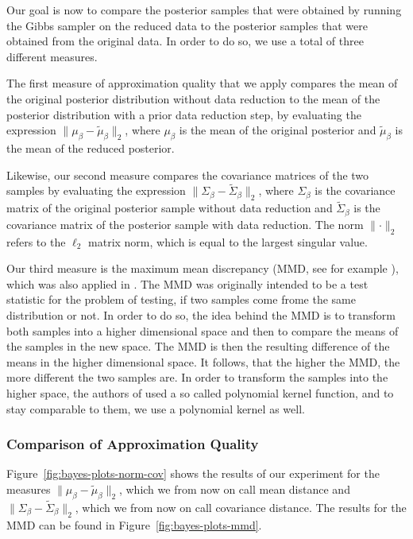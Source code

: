Our goal is now to compare the posterior samples that were
obtained by running the Gibbs sampler on the reduced data
to the posterior samples that were obtained from the
original data.
In order to do so, we use a total of three different measures.

The first measure of approximation quality that we
apply compares the mean
of the original posterior distribution without data reduction to
the mean of the posterior distribution with a prior data reduction step,
by evaluating the expression
$\lVert \mu_\beta - \widetilde{\mu}_\beta \rVert_2$,
where $\mu_\beta$ is the mean of the original posterior and
$\widetilde{\mu}_\beta$ is the mean of the reduced posterior.

Likewise, our second measure compares the covariance matrices of
the two samples by evaluating the expression
$\lVert \Sigma_\beta - \widetilde{\Sigma}_\beta \rVert_2$,
where $\Sigma_\beta$ is the covariance matrix of the original
posterior sample without data reduction and
$\widetilde{\Sigma}_\beta$ is the covariance matrix of the
posterior sample with data reduction. The norm $\lVert \cdot \rVert_2$
refers to the $\ell_2$ matrix norm, which is equal to the
largest singular value.

Our third measure is the maximum mean discrepancy (MMD,
see for example \cite{mmd}),
which was also applied in \cite{scalable-bayesian-logreg}.
The MMD was originally intended to be a test statistic for the
problem of testing, if two samples come frome the same
distribution or not.
In order to do so, the idea behind the MMD is to transform
both samples into a higher dimensional space and then to
compare the means of the samples in the new space.
The MMD is then the resulting difference of the means in the
higher dimensional space. It follows, that the higher the
MMD, the more different the two samples are.
In order to transform the samples
into the higher space, the authors of
\cite{scalable-bayesian-logreg} used a so called polynomial
kernel function, and to stay comparable to them, we
use a polynomial kernel as well.

\subsubsection{Comparison of Approximation Quality}

Figure~\ref{fig:bayes-plots-norm-cov} shows the results of our
experiment for the measures
$\lVert \mu_\beta - \widetilde{\mu}_\beta \rVert_2$, which
we from now on call mean distance and
$\lVert \Sigma_\beta - \widetilde{\Sigma}_\beta \rVert_2$,
which we from now on call covariance distance.
The results for the MMD can be found in Figure~\ref{fig:bayes-plots-mmd}.

